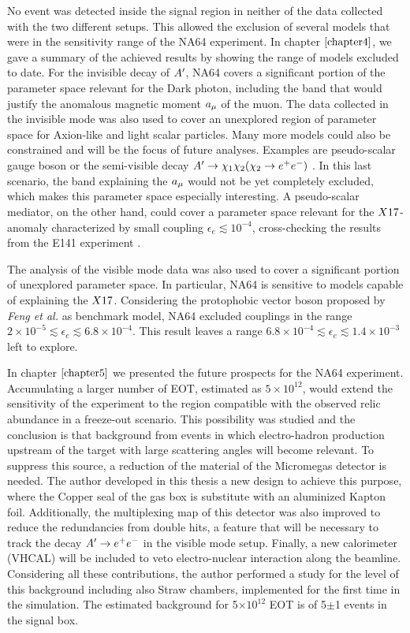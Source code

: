 No event was detected inside the signal region in neither of the data collected with the two different setups. This allowed the exclusion of several models that were in the sensitivity range of the NA64 experiment. In chapter $\ref{chapter4}$, we gave a summary of the achieved results by showing the range of models excluded to date. For the invisible decay of $A'$, NA64 covers a significant portion of the parameter space relevant for the Dark photon, including the band that would justify the anomalous magnetic moment $a_{\mu}$ of the muon.
The data collected in the invisible mode was also used to cover an unexplored region of parameter space for Axion-like and light scalar particles. Many more models could also be constrained and will be the focus of future analyses. Examples are pseudo-scalar gauge boson or the semi-visible decay $A' \to \chi_1 \chi_2 (\chi_2 \to e^+e^-)$ \cite{Mohlabeng_2019}. In this last scenario, the band explaining the $a_{\mu}$ would not be yet completely excluded, which makes this parameter space especially interesting. A pseudo-scalar mediator, on the other hand, could cover a parameter space relevant for the $X17$-anomaly characterized by small coupling $\epsilon_e \lesssim 10^{-4}$, cross-checking the results from the E141 experiment \cite{blum}.

The analysis of the visible mode data was also used to cover a significant portion of unexplored parameter space. In particular, NA64 is sensitive to models capable of explaining the $X17$. Considering the protophobic vector boson proposed by \textit{Feng et al.}\cite{Feng:2016jff} as benchmark model, NA64 excluded couplings in the range $2 \times 10^{-5} \lesssim \epsilon_e \lesssim 6.8 \times 10^{-4}$. This result leaves a range $6.8 \times 10^{-4} \lesssim \epsilon_e \lesssim 1.4 \times 10^{-3}$ left to explore.

In chapter $\ref{chapter5}$ we presented the future prospects for the NA64 experiment. Accumulating a larger number of EOT, estimated as $5 \times 10^{12}$, would extend the sensitivity of the experiment to the region compatible with the observed relic abundance in a freeze-out scenario. This possibility was studied and the conclusion is that background from events in which electro-hadron production upstream of the target with large scattering angles will become relevant. To suppress this source, a reduction of the material of the Micromegas detector is needed. The author developed in this thesis a new design to achieve this purpose, where the Copper seal of the gas box is substitute with an aluminized Kapton foil. Additionally, the multiplexing map of this detector was also improved to reduce the redundancies from double hits, a feature that will be necessary to track the decay $A' \to e^+e^-$ in the visible mode setup. Finally, a new calorimeter (VHCAL) will be included to veto electro-nuclear interaction along the beamline. Considering all these contributions, the author performed a study for the level of this background including also Straw chambers, implemented for the first time in the simulation. The estimated background for 5$\times 10^{12}$ EOT is of 5$\pm$1 events in the signal box.

